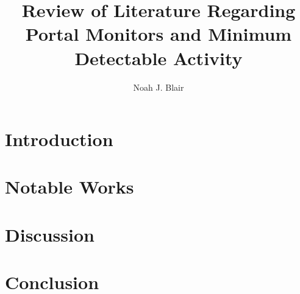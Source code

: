 \documentclass[12 pt]{paper}
\title{Review of Literature Regarding Portal Monitors and Minimum Detectable Activity}
\author{Noah J. Blair}
\begin{document}
\maketitle
\begin{abstract}
  \noindent
  
\end{abstract}
\tableofcontents
\newpage
\section{Introduction}

\section{Notable Works}

\section{Discussion}

\section{Conclusion}



{}

\end{document}
